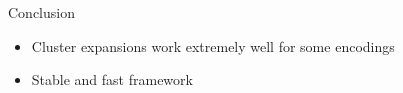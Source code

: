 \begin{frame}{Conclusion}
    \begin{itemize}
        \item Cluster expansions work extremely well for some encodings
        \item Stable and fast framework
    \end{itemize}
\end{frame}

